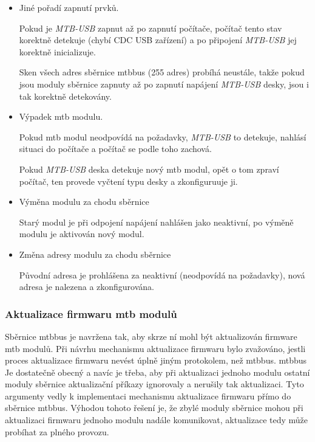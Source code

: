 \begin{itemize}
\item Jiné pořadí zapnutí prvků.

Pokud je \textit{MTB-USB} zapnut až po zapnutí počítače, počítač tento stav
korektně detekuje (chybí CDC USB zařízení) a po připojení \textit{MTB-USB} jej
korektně inicializuje.

Sken všech adres sběrnice \gls{mtbbus} (255 adres) probíhá neustále, takže
pokud jsou moduly sběrnice zapnuty až po zapnutí napájení \textit{MTB-USB} desky,
jsou i tak korektně detekovány.

\item Výpadek \gls{mtb} modulu.

Pokud \gls{mtb} modul neodpovídá na požadavky, \textit{MTB-USB} to detekuje, nahlásí
situaci do počítače a počítač se podle toho zachová.

Pokud \textit{MTB-USB} deska detekuje nový \gls{mtb} modul, opět o tom zpraví
počítač, ten provede vyčtení typu desky a zkonfiguruuje ji.

\item Výměna modulu za chodu sběrnice

Starý modul je při odpojení napájení nahlášen jako neaktivní, po výměně modulu
je aktivován nový modul.

\item Změna adresy modulu za chodu sběrnice

Původní adresa je prohlášena za neaktivní (neodpovídá na požadavky), nová adresa
je nalezena a zkonfigurována.

\end{itemize}


\subsubsection{Aktualizace firmwaru \gls{mtb} modulů}

Sběrnice \gls{mtbbus} je navržena tak, aby skrze ní mohl být aktualizován
firmware \gls{mtb} modulů. Při návrhu mechanismu aktualizace firmwaru bylo
zvažováno, jestli proces aktualizace firmwaru nevést úplně jiným protokolem,
než \gls{mtbbus}. \gls{mtbbus} Je dostatečně obecný a navíc je třeba, aby
při aktualizaci jednoho modulu ostatní moduly sběrnice aktualizační příkazy
ignorovaly a nerušily tak aktualizaci. Tyto argumenty vedly k implementaci
mechanismu aktualizace firmwaru přímo do sběrnice \gls{mtbbus}. Výhodou tohoto
řešení je, že zbylé moduly sběrnice mohou při aktualizaci firmwaru jednoho
modulu nadále komunikovat, aktualizace tedy může probíhat za plného provozu.

